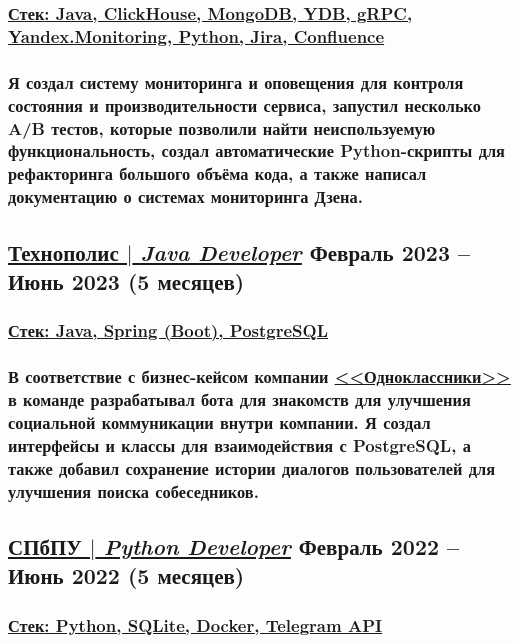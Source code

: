 \documentclass[11pt]{article}
\begin{document}
\subsubsection{\underline{\textbf{Стек}: Java, ClickHouse, MongoDB, YDB, gRPC, Yandex.Monitoring, Python, Jira, Confluence}}
\subsubsection{Я создал \textbf{систему мониторинга и оповещения} для контроля состояния и производительности сервиса, запустил несколько \textbf{A/B тестов}, которые позволили найти неиспользуемую функциональность, создал \textbf{автоматические Python-скрипты} для рефакторинга большого объёма кода, а также \textbf{написал документацию} о системах мониторинга Дзена.}
\begin{itemize}
\end{itemize}

\subsection{\href{https://github.com/Sanerins/tamtam-one-coffee-bot}{\underline{Технополис $|$ {\normalfont\textit{Java Developer}}}} \hfill Февраль 2023 -- Июнь 2023 (5 месяцев)}
\subsubsection{\underline{\textbf{Стек}: Java, Spring (Boot), PostgreSQL}}
\subsubsection{В соответствие с бизнес-кейсом компании \href{https://ok.ru/}{\underline{<<Одноклассники>>}} в команде разрабатывал бота для знакомств для улучшения социальной коммуникации внутри компании. Я создал \textbf{интерфейсы и классы для взаимодействия с PostgreSQL}, а также добавил \textbf{сохранение истории диалогов пользователей} для улучшения поиска собеседников.}
\begin{itemize}
\end{itemize}

\subsection{\href{https://github.com/PaaavelZ/FPA-pybot}{\underline{СПбПУ $|$ {\normalfont\textit{Python Developer}}}} \hfill Февраль 2022 -- Июнь 2022 (5 месяцев)}
\subsubsection{\underline{\textbf{Стек}: Python, SQLite, Docker, Telegram API}}
\end{document}

